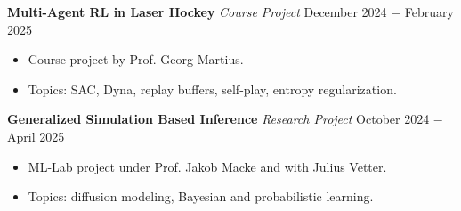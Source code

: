\documentclass{article}
\begin{document}
\noindent \textbf{Multi-Agent RL in Laser Hockey} \textit{Course Project} \href{https://github.com/RobinU434/LaserHockeyProject}{\faGithubSquare} \hfill December 2024 $-$ February 2025
\begin{itemize}[noitemsep,nolistsep,leftmargin=*]
    \item Course project by Prof. Georg Martius.
    \item Topics: SAC, Dyna, replay buffers, self-play, entropy regularization.\\
\end{itemize}

\noindent \textbf{Generalized Simulation Based Inference} \textit{Research Project} 
\href{https://github.com/mackelab/neuralgbi_diffusion}{\faGithubSquare} \hfill October 2024 $-$ April 2025
\begin{itemize}[noitemsep,nolistsep,leftmargin=*]
    \item ML-Lab project under Prof. Jakob Macke and with Julius Vetter.
    \item Topics: diffusion modeling, Bayesian and probabilistic learning.\\
\end{itemize}
\end{document}
